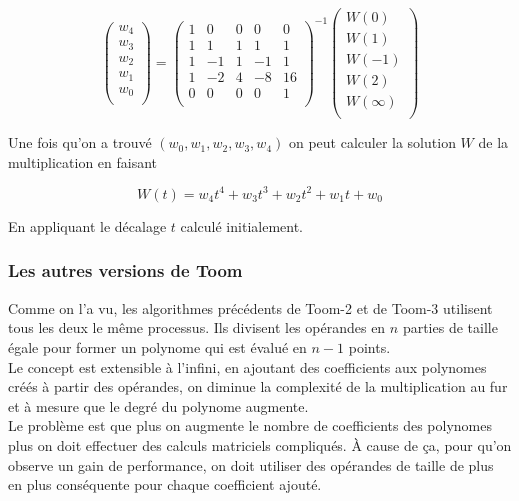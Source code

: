 \documentclass[letterpaper]{article}
\begin{document}
$$
\begin{pmatrix}
  w_4 \\
  w_3 \\
  w_2 \\
  w_1 \\
  w_0 \\
 \end{pmatrix}
=
\begin{pmatrix}
  1 & 0 & 0 & 0 & 0 \\
  1 & 1 & 1 & 1 & 1 \\
  1 &-1 & 1 &-1 & 1 \\
  1 &-2 & 4 &-8 &16 \\
  0 & 0 & 0 & 0 & 1 \\
\end{pmatrix}^{-1}
\begin{pmatrix}
  W(0) \\
  W(1) \\
  W(-1) \\
  W(2) \\
  W(\infty) \\
\end{pmatrix}
$$

Une fois qu'on a trouvé $(w_0, w_1, w_2, w_3, w_4)$ on peut calculer la
solution $W$ de la multiplication en faisant

  $$W(t) = w_4 t^4 + w_3 t^3 + w_2 t^2 + w_1 t + w_0$$

En appliquant le décalage $t$ calculé initialement.

\subsubsection{Les autres versions de Toom}

Comme on l'a vu, les algorithmes précédents de Toom-2 et de Toom-3 utilisent
tous les deux le même processus. Ils divisent les opérandes en $n$ parties
de taille égale pour former un polynome qui est évalué en $n - 1$
points.\\
Le concept est extensible à l'infini, en ajoutant des coefficients aux
polynomes créés à partir des opérandes, on diminue la complexité de la
multiplication au fur et à mesure que le degré du polynome augmente.\\
Le problème est que plus on augmente le nombre de coefficients des polynomes
plus on doit effectuer des calculs matriciels compliqués. À cause de ça, pour
qu'on observe un gain de performance, on doit utiliser des opérandes de taille
de plus en plus conséquente pour chaque coefficient ajouté.
\end{document}
